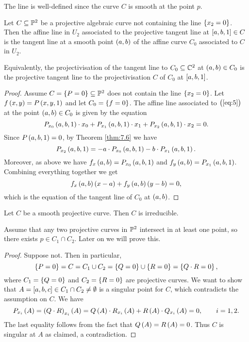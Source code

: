 \begin{note*}
The line is well-defined since the curve $ C $ is smooth at the point $ p $.
\end{note*}

\begin{proposition}
Let $ C \subseteq \P^2 $ be a projective algebraic curve not containing the line $ \cbr{x_2 = 0} $. Then the affine line in $ U_2 $ associated to the projective tangent line at $ \sbr{a, b, 1} \in C $ is the tangent line at a smooth point $ \br{a, b} $ of the affine curve $ C_0 $ associated to $ C $ in $ U_2 $.
\end{proposition}

Equivalently, the projectivisation of the tangent line to $ C_0 \subseteq \C^2 $ at $ \br{a, b} \in C_0 $ is the projective tangent line to the projectivisation $ C $ of $ C_0 $ at $ \sbr{a, b, 1} $.

\pagebreak

\begin{proof}
Assume $ C = \cbr{P = 0} \subseteq \P^2 $ does not contain the line $ \cbr{x_2 = 0} $. Let $ f\br{x, y} = P\br{x, y, 1} $ and let $ C_0 = \cbr{f = 0} $. The affine line associated to $ \br{\ref{eq:5}} $ at the point $ \br{a, b} \in C_0 $ is given by the equation
$$ P_{x_0}\br{a, b, 1} \cdot x_0 + P_{x_1}\br{a, b, 1} \cdot x_1 + P_{x_2}\br{a, b, 1} \cdot x_2 = 0. $$
Since $ P\br{a, b, 1} = 0 $, by Theorem \ref{thm:7.6} we have
$$ P_{x_2}\br{a, b, 1} = -a \cdot P_{x_0}\br{a, b, 1} - b \cdot P_{x_1}\br{a, b, 1}. $$
Moreover, as above we have $ f_x\br{a, b} = P_{x_0}\br{a, b, 1} $ and $ f_y\br{a, b} = P_{x_1}\br{a, b, 1} $. Combining everything together we get
$$ f_x\br{a, b}\br{x - a} + f_y\br{a, b}\br{y - b} = 0, $$
which is the equation of the tangent line of $ C_0 $ at $ \br{a, b} $.
\end{proof}

\begin{theorem}
\label{thm:7.9}
Let $ C $ be a smooth projective curve. Then $ C $ is irreducible.
\end{theorem}

Assume that any two projective curves in $ \P^2 $ intersect in at least one point, so there exists $ p \in C_1 \cap C_2 $. Later on we will prove this.

\begin{proof}
Suppose not. Then in particular,
$$ \cbr{P = 0} = C = C_1 \cup C_2 = \cbr{Q = 0} \cup \cbr{R = 0} = \cbr{Q \cdot R = 0}, $$
where $ C_1 = \cbr{Q = 0} $ and $ C_2 = \cbr{R = 0} $ are projective curves. We want to show that $ A = \sbr{a, b, c} \in C_1 \cap C_2 \ne \emptyset $ is a singular point for $ C $, which contradicts the assumption on $ C $. We have
$$ P_{x_i}\br{A} = \br{Q \cdot R}_{x_i}\br{A} = Q\br{A} \cdot R_{x_i}\br{A} + R\br{A} \cdot Q_{x_i}\br{A} = 0, \qquad i = 1, 2. $$
The last equality follows from the fact that $ Q\br{A} = R\br{A} = 0 $. Thus $ C $ is singular at $ A $ as claimed, a contradiction.
\end{proof}

